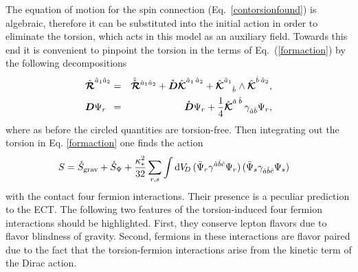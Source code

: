 \documentclass[twocolumn,showpacs,showkeys,prd,superscriptaddress]{revtex4-1}
\begin{document}

The equation of motion for the spin connection (Eq.~\eqref{contorsionfound}) is algebraic, therefore it can be substituted into the initial action in order to eliminate the torsion, which acts in this model as an auxiliary field. Towards this end it is convenient to pinpoint the torsion in the terms of Eq.~(\ref{formaction}) by the following decompositions
\begin{eqnarray}
  \label{gravdecomp}
  \Rfhn{a}{1}{a}{2} &=& \Rfhnfree{a}{1}{a}{2} + \free{\Df}\Kfhn{a}{1}{a}{2} + \Kfhnud{a}{1}{b}{}\wedge\Kfhn{b}{}{a}{2},\\
  \label{F-decomp}
  \Df\Psi_r \ \, &=& \free{\Df}\Psi_r + \frac{1}{4}\Kfhn{a}{}{b}{}\,\gamma_{\hat{a}\hat{b}}\Psi_r,
\end{eqnarray}
where as before the circled quantities are torsion-free. Then integrating out the torsion in Eq. \eqref{formaction} one finds the action
\begin{align}\label{4FI}
  S &= \free{S}_\text{grav} + \free{S}_\Psi + \frac{\kappa_* ^2}{32}\sum_{r,s}\int \dv[D]\,(\bar{\Psi}_r\gamma^{\hat{a}\hat{b}\hat{c}}\Psi_r)\,(\bar{\Psi}_s\gamma_{\hat{a}\hat{b}\hat{c}}\Psi_s)
\end{align}
with the contact four fermion interactions. Their presence is a peculiar prediction to the ECT. 
%
%
The following two features of the torsion-induced four fermion interactions should be highlighted. First, they conserve lepton flavors
due to flavor blindness of gravity. Second, fermions in these interactions are flavor paired due to the fact that
the torsion-fermion interactions arise from the kinetic term of  the Dirac action. 
\end{document}
